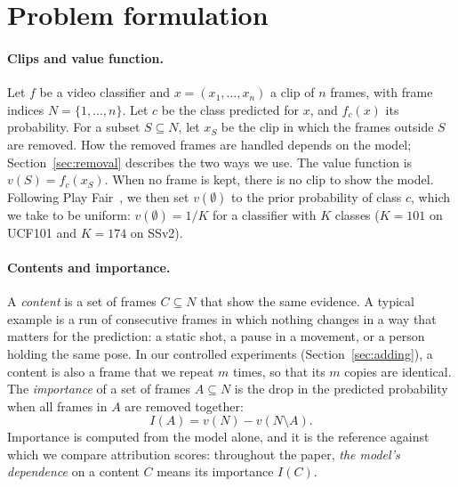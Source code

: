 \section{Problem formulation}
\label{sec:problem}


\paragraph{Clips and value function.}
Let $f$ be a video classifier and $x = (x_1, \dots, x_n)$ a clip of $n$ frames, with frame indices $N = \{1, \dots, n\}$.
Let $c$ be the class predicted for $x$, and $f_c(x)$ its probability.
For a subset $S \subseteq N$, let $x_S$ be the clip in which the frames outside $S$ are removed.
How the removed frames are handled depends on the model; Section~\ref{sec:removal} describes the two ways we use.
The value function is $v(S) = f_c(x_S)$.
When no frame is kept, there is no clip to show the model.
Following Play Fair~\citep{will_price_ec92d5a0}, we then set $v(\emptyset)$ to the prior probability of class $c$, which we take to be uniform: $v(\emptyset) = 1/K$ for a classifier with $K$ classes ($K = 101$ on UCF101 and $K = 174$ on SSv2).

\paragraph{Contents and importance.}
A \emph{content} is a set of frames $C \subseteq N$ that show the same evidence.
A typical example is a run of consecutive frames in which nothing changes in a way that matters for the prediction: a static shot, a pause in a movement, or a person holding the same pose.
In our controlled experiments (Section~\ref{sec:adding}), a content is also a frame that we repeat $m$ times, so that its $m$ copies are identical.
The \emph{importance} of a set of frames $A \subseteq N$ is the drop in the predicted probability when all frames in $A$ are removed together:
\begin{equation}
  I(A) = v(N) - v(N \setminus A).
  \label{eq:importance}
\end{equation}
Importance is computed from the model alone, and it is the reference against which we compare attribution scores: throughout the paper, \emph{the model's dependence} on a content $C$ means its importance $I(C)$.


